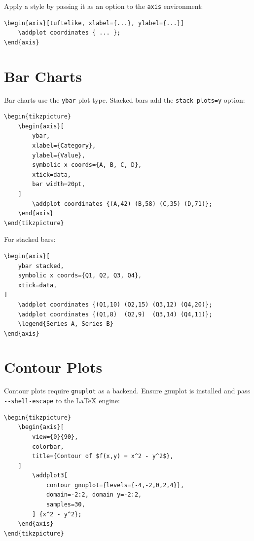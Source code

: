 Apply a style by passing it as an option to the \texttt{axis} environment:

\begin{verbatim}
\begin{axis}[tuftelike, xlabel={...}, ylabel={...}]
    \addplot coordinates { ... };
\end{axis}
\end{verbatim}

\section{Bar Charts}

Bar charts use the \texttt{ybar} plot type. Stacked bars add the
\texttt{stack plots=y} option:

\begin{verbatim}
\begin{tikzpicture}
    \begin{axis}[
        ybar,
        xlabel={Category},
        ylabel={Value},
        symbolic x coords={A, B, C, D},
        xtick=data,
        bar width=20pt,
    ]
        \addplot coordinates {(A,42) (B,58) (C,35) (D,71)};
    \end{axis}
\end{tikzpicture}
\end{verbatim}

For stacked bars:

\begin{verbatim}
\begin{axis}[
    ybar stacked,
    symbolic x coords={Q1, Q2, Q3, Q4},
    xtick=data,
]
    \addplot coordinates {(Q1,10) (Q2,15) (Q3,12) (Q4,20)};
    \addplot coordinates {(Q1,8)  (Q2,9)  (Q3,14) (Q4,11)};
    \legend{Series A, Series B}
\end{axis}
\end{verbatim}

\section{Contour Plots}

Contour plots require \texttt{gnuplot} as a backend. Ensure gnuplot is
installed and pass \texttt{-{}-shell-escape} to the \LaTeX{} engine:

\begin{verbatim}
\begin{tikzpicture}
    \begin{axis}[
        view={0}{90},
        colorbar,
        title={Contour of $f(x,y) = x^2 - y^2$},
    ]
        \addplot3[
            contour gnuplot={levels={-4,-2,0,2,4}},
            domain=-2:2, domain y=-2:2,
            samples=30,
        ] {x^2 - y^2};
    \end{axis}
\end{tikzpicture}
\end{verbatim}

